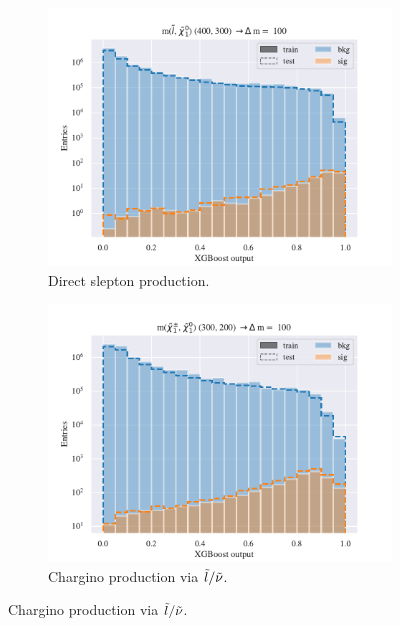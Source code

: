 \begin{figure}[H]
    \centering
    \begin{subfigure}[t!]{0.49\textwidth}
        \includegraphics[width = \textwidth]{Figures/SlepSlep/ML/BDT/High_level/Low/scaled_train_test_395984.pdf}
        \caption{Direct slepton production.}
        \label{fig:traintestscaledBDTSlepslepLow}
    \end{subfigure}
    \begin{subfigure}[t!]{0.49\textwidth}
        \includegraphics[width = \textwidth]{Figures/SlepSnu/BDT/High_level/Low/scaled_train_test_397115.pdf}
        \caption{Chargino production via $\Tilde{l}/\Tilde{\nu}$.}
        \label{fig:}
    \end{subfigure}

\end{figure}
